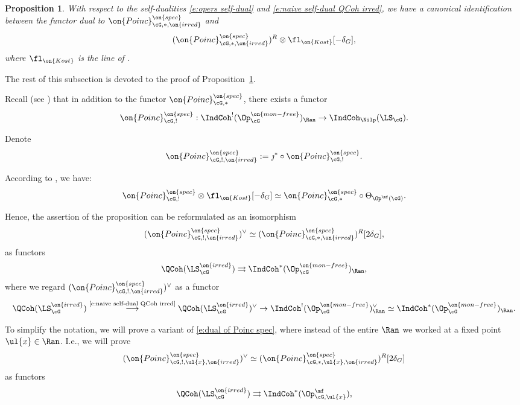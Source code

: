 \documentclass[9pt]{amsart}
\newtheorem{prop}[subsubsection]{Proposition}
\theoremstyle{remark}
\theoremstyle{definition}
\theoremstyle{remark}
\newcommand{\propref}[1]{Proposition~\ref{#1}}
\numberwithin{equation}{section}
\begin{document}
\begin{prop} \label{p:dual of Poinc}
With respect to the self-dualities \eqref{e:opers self-dual} and \eqref{e:naive self-dual QCoh irred}, we have a canonical
identification between the functor \emph{dual} to $\on{Poinc}^{\on{spec}}_{\cG,*,\on{irred}}$ and
$$(\on{Poinc}^{\on{spec}}_{\cG,*,\on{irred}})^R\otimes \fl_{\on{Kost}}[-\delta_G],$$
where $\fl_{\on{Kost}}$ is the line of \cite[Sect. 17.2.2]{GLC2}. 
\end{prop}

The rest of this subsection is devoted to the proof of \propref{p:dual of Poinc}.

\sssec{} 

Recall (see \cite[Sect. 17.4.1]{GLC2}) 
that in addition to the functor $\on{Poinc}^{\on{spec}}_{\cG,*}$, there exists a functor
$$\on{Poinc}^{\on{spec}}_{\cG,!}:\IndCoh^!(\Op^{\on{mon-free}}_\cG)_\Ran\to \IndCoh_\Nilp(\LS_\cG).$$

\medskip

Denote
$$\on{Poinc}^{\on{spec}}_{\cG,!,\on{irred}}:=\jmath^*\circ \on{Poinc}^{\on{spec}}_{\cG,!}.$$

\medskip

According to \cite[Theorem 17.4.7]{GLC2}, we have:
$$\on{Poinc}^{\on{spec}}_{\cG,!}\otimes \fl_{\on{Kost}}[-\delta_G]\simeq 
\on{Poinc}^{\on{spec}}_{\cG,*}\circ \Theta_{\Op^\mf(\cG)}.$$

Hence, the assertion of the proposition can be reformulated as an isomorphism 
\begin{equation} \label{e:dual of Poinc spec}
(\on{Poinc}^{\on{spec}}_{\cG,!,\on{irred}})^\vee \simeq (\on{Poinc}^{\on{spec}}_{\cG,*,\on{irred}})^R[2\delta_G],
\end{equation}
as functors
$$\QCoh(\LS^{\on{irred}}_\cG)\rightrightarrows \IndCoh^*(\Op^{\on{mon-free}}_\cG)_\Ran,$$
where we regard $(\on{Poinc}^{\on{spec}}_{\cG,!,\on{irred}})^\vee$ as a functor
$$\QCoh(\LS^{\on{irred}}_\cG)\overset{\text{\eqref{e:naive self-dual QCoh irred}}}\longrightarrow \QCoh(\LS^{\on{irred}}_\cG)^\vee 
\to \IndCoh^!(\Op^{\on{mon-free}}_\cG)_\Ran^\vee \simeq \IndCoh^*(\Op^{\on{mon-free}}_\cG)_\Ran.$$

\medskip

To simplify the notation, we will prove a variant of \eqref{e:dual of Poinc spec}, where instead of the entire $\Ran$ we worked at a fixed
point $\ul{x}\in \Ran$. I.e., we will prove
\begin{equation} \label{e:dual of Poinc spec x}
(\on{Poinc}^{\on{spec}}_{\cG,!,\ul{x},\on{irred}})^\vee \simeq (\on{Poinc}^{\on{spec}}_{\cG,*,\ul{x},\on{irred}})^R[2\delta_G]
\end{equation}
as functors 
$$\QCoh(\LS^{\on{irred}}_\cG)\rightrightarrows \IndCoh^*(\Op^\mf_{\cG,\ul{x}}),$$
\end{document}
